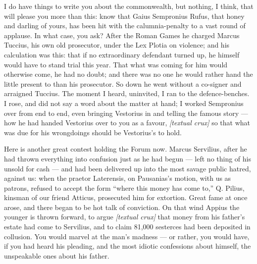 

 I do have things to write you about the commonwealth, but nothing, I think, that will please you more than this: know that Gaius Sempronius Rufus, that honey and darling of yours, has been hit with the calumnia-penalty to a vast round of applause. In what case, you ask? After the Roman Games he charged Marcus Tuccius, his own old prosecutor, under the Lex Plotia on violence; and his calculation was this: that if no extraordinary defendant turned up, he himself would have to stand trial this year. That what was coming for him would otherwise come, he had no doubt; and there was no one he would rather hand the little present to than his prosecutor. So down he went without a co-signer and arraigned Tuccius. The moment I heard, uninvited, I ran to the defence-benches. I rose, and did not say a word about the matter at hand; I worked Sempronius over from end to end, even bringing Vestorius in and telling the famous story --- how he had handed Vestorius over to you as a favour, \textit{[textual crux]} so that what was due for his wrongdoings should be Vestorius's to hold.

 Here is another great contest holding the Forum now. Marcus Servilius, after he had thrown everything into confusion just as he had begun --- left no thing of his unsold for cash --- and had been delivered up into the most savage public hatred, against us: when the praetor Laterensis, on Pausanias's motion, with us as patrons, refused to accept the form ``where this money has come to,'' Q. Pilius, kinsman of our friend Atticus, prosecuted him for extortion. Great fame at once arose, and there began to be hot talk of conviction. On that wind Appius the younger is thrown forward, to argue \textit{[textual crux]} that money from his father's estate had come to Servilius, and to claim 81,000 sesterces had been deposited in collusion. You would marvel at the man's madness --- or rather, you would have, if you had heard his pleading, and the most idiotic confessions about himself, the unspeakable ones about his father.

